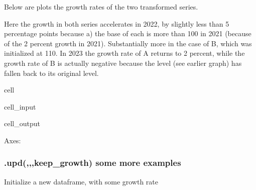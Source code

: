 \documentclass[letterpaper,10pt,english]{jupyterBook}
\begin{document}
\sphinxAtStartPar
Below are plots the growth rates of the two transformed series.

\sphinxAtStartPar
Here the growth in both series accelerates in 2022, by slightly less than 5 percentage points because a) the base of each is more than 100 in 2021 (because of the 2 percent growth in 2021). Substantially more in the case of  B, which was initialized at 110. In 2023 the growth rate of A returns to 2 percent, while the growth rate of B is actually negative because the level (see earlier graph) has fallen back to its original level.

\begin{sphinxuseclass}{cell}\begin{sphinxVerbatimInput}

\begin{sphinxuseclass}{cell_input}
\begin{sphinxVerbatim}[commandchars=\\\{\}]
\PYG{p}{[}\PYG{p}{[}\PYG{p}{]}\PYG{p}{]}
\end{sphinxVerbatim}

\end{sphinxuseclass}\end{sphinxVerbatimInput}
\begin{sphinxVerbatimOutput}

\begin{sphinxuseclass}{cell_output}
\begin{sphinxVerbatim}[commandchars=\\\{\}]
\PYGZlt{}Axes: \PYGZgt{}
\end{sphinxVerbatim}

\noindent{}

\end{sphinxuseclass}\end{sphinxVerbatimOutput}

\end{sphinxuseclass}

\subsubsection{.upd(,,,keep\_growth) some more examples}
\label{\detokenize{content/04_PythonEssentials/UpdateCommand:upd-keep-growth-some-more-examples}}
\sphinxAtStartPar
Initialize a new dataframe, with some growth rate
\end{document}
